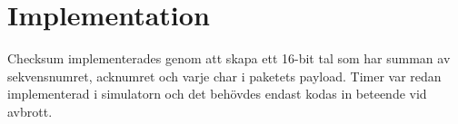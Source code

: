 \section{Implementation}
Checksum implementerades genom att skapa ett 16-bit tal som har summan av sekvensnumret, acknumret och varje char i paketets payload. 
Timer var redan implementerad i simulatorn och det behövdes endast kodas in beteende vid avbrott. 
